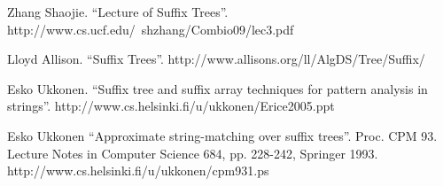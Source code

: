 \documentclass{article}
\begin{document}
\begin{thebibliography}{99}
Zhang Shaojie. ``Lecture of Suffix Trees''. http://www.cs.ucf.edu/~shzhang/Combio09/lec3.pdf

Lloyd Allison. ``Suffix Trees''. http://www.allisons.org/ll/AlgDS/Tree/Suffix/

Esko Ukkonen. ``Suffix tree and suffix array techniques for pattern analysis in strings''. http://www.cs.helsinki.fi/u/ukkonen/Erice2005.ppt

Esko Ukkonen ``Approximate string-matching over suffix trees''. Proc. CPM 93. Lecture Notes in Computer Science 684, pp. 228-242, Springer 1993. http://www.cs.helsinki.fi/u/ukkonen/cpm931.ps

\end{thebibliography}

\ifx\wholebook\relax \else
\end{document}
